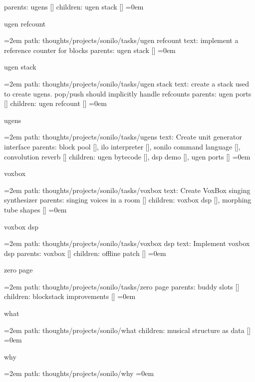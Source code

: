 \smallskip
parents:  ugens []
\smallskip
children: ugen stack []
\smallskip
\leftskip=0em
\par\endgroup
\bigskip
{}
ugen refcount
\smallskip
\par\begingroup
\leftskip=2em
path: thoughts/projects/sonilo/tasks/ugen refcount
\smallskip
text:  implement a reference counter for blocks
\smallskip
parents:  ugen stack []
\smallskip
\leftskip=0em
\par\endgroup
\bigskip
{}
ugen stack
\smallskip
\par\begingroup
\leftskip=2em
path: thoughts/projects/sonilo/tasks/ugen stack
\smallskip
text:  create a stack used to create ugens. pop/push should implicitly handle refcounts
\smallskip
parents:  ugen ports []
\smallskip
children: ugen refcount []
\smallskip
\leftskip=0em
\par\endgroup
\bigskip
{}
ugens
\smallskip
\par\begingroup
\leftskip=2em
path: thoughts/projects/sonilo/tasks/ugens
\smallskip
text:  Create unit generator interface
\smallskip
parents:  block pool [], ilo interpreter [], sonilo command language [], convolution reverb []
\smallskip
children: ugen bytecode [], dsp demo [], ugen ports []
\smallskip
\leftskip=0em
\par\endgroup
\bigskip
{}
voxbox
\smallskip
\par\begingroup
\leftskip=2em
path: thoughts/projects/sonilo/tasks/voxbox
\smallskip
text:  Create VoxBox singing synthesizer
\smallskip
parents:  singing voices in a room []
\smallskip
children: voxbox dsp [], morphing tube shapes []
\smallskip
\leftskip=0em
\par\endgroup
\bigskip
{}
voxbox dsp
\smallskip
\par\begingroup
\leftskip=2em
path: thoughts/projects/sonilo/tasks/voxbox dsp
\smallskip
text:  Implement voxbox dsp
\smallskip
parents:  voxbox []
\smallskip
children: offline patch []
\smallskip
\leftskip=0em
\par\endgroup
\bigskip
{}
zero page
\smallskip
\par\begingroup
\leftskip=2em
path: thoughts/projects/sonilo/tasks/zero page
\smallskip
parents:  buddy slots []
\smallskip
children: blockstack improvements []
\smallskip
\leftskip=0em
\par\endgroup
\bigskip
{}
what
\smallskip
\par\begingroup
\leftskip=2em
path: thoughts/projects/sonilo/what
\smallskip
children: musical structure as data []
\smallskip
\leftskip=0em
\par\endgroup
\bigskip
{}
why
\smallskip
\par\begingroup
\leftskip=2em
path: thoughts/projects/sonilo/why
\smallskip
\leftskip=0em
\par\endgroup
\bigskip
\bye
